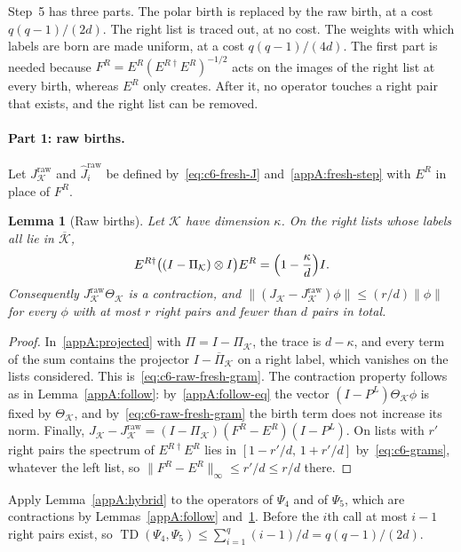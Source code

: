 \documentclass[11pt,letterpaper]{article}
\newtheorem{lemma}[theorem]{Lemma}
\theoremstyle{definition}\newtheorem{definition}[theorem]{Definition}
\newcommand{\TD}{\operatorname{TD}}
\newcommand{\norm}[1]{\lVert#1\rVert}
\begin{document}
Step~5 has three parts. The polar birth is replaced by the raw birth,
at a cost $q(q-1)/(2d)$. The right list is traced out, at no cost.
The weights with which labels are born are made uniform, at a cost
$q(q-1)/(4d)$. The first part is needed because
$F^R=E^R(E^{R\dagger}E^R)^{-1/2}$ acts on the images of the right list
at every birth, whereas $E^R$ only creates. After it, no operator
touches a right pair that exists, and the right list can be removed.

\paragraph{Part 1: raw births.}
Let $J^{\mathrm{raw}}_{\mathcal K}$ and $\widehat J^{\mathrm{raw}}_i$
be defined by~\eqref{eq:c6-fresh-J} and~\eqref{appA:fresh-step} with
$E^R$ in place of $F^R$.

\begin{lemma}[Raw births]\label{appA:raw}
Let $\mathcal K$ have dimension $\kappa$. On the right lists whose
labels all lie in $\overline{\mathcal K}$,
\begin{equation}\label{eq:c6-raw-fresh-gram}
 E^{R\dagger}\bigl((I-\Pi_{\mathcal K})\otimes I\bigr)E^R
 =\Bigl(1-\frac{\kappa}{d}\Bigr)I .
\end{equation}
Consequently $J^{\mathrm{raw}}_{\mathcal K}\Theta_{\mathcal K}$ is a
contraction, and
$\norm{(J_{\mathcal K}-J^{\mathrm{raw}}_{\mathcal K})\phi}\le
(r/d)\norm\phi$ for every $\phi$ with at most $r$ right pairs and
fewer than $d$ pairs in total.
\end{lemma}

\begin{proof}
In~\eqref{appA:projected} with $\Pi=I-\Pi_{\mathcal K}$, the trace is
$d-\kappa$, and every term of the sum contains the projector
$I-\overline\Pi_{\mathcal K}$ on a right label, which vanishes on the
lists considered. This is~\eqref{eq:c6-raw-fresh-gram}. The
contraction property follows as in Lemma~\ref{appA:follow}:
by~\eqref{appA:follow-eq} the vector $(I-P^L)\Theta_{\mathcal K}\phi$
is fixed by $\Theta_{\mathcal K}$, and
by~\eqref{eq:c6-raw-fresh-gram} the birth term does not increase its
norm. Finally,
$J_{\mathcal K}-J^{\mathrm{raw}}_{\mathcal K}
=(I-\Pi_{\mathcal K})(F^R-E^R)(I-P^L)$. On lists with $r'$ right pairs
the spectrum of $E^{R\dagger}E^R$ lies in $[1-r'/d,\,1+r'/d]$
by~\eqref{eq:c6-grams}, whatever the left list, so
$\norm{F^R-E^R}_\infty\le r'/d\le r/d$ there.
\end{proof}

Apply Lemma~\ref{appA:hybrid} to the operators of $\Psi_4$ and of
$\Psi_5$, which are contractions by Lemmas~\ref{appA:follow}
and~\ref{appA:raw}. Before the $i$th call at most $i-1$ right pairs exist, so
$\TD(\Psi_4,\Psi_5)\le\sum_{i=1}^q(i-1)/d=q(q-1)/(2d)$.
\end{document}
